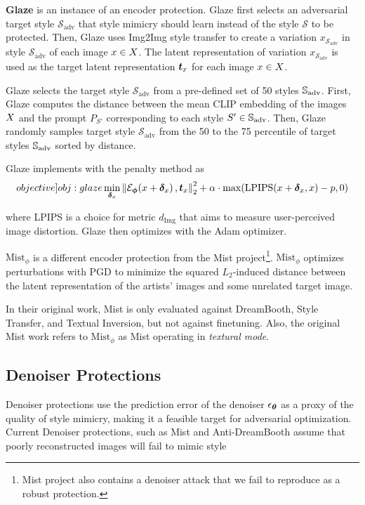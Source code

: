 \documentclass{article}
\newcommand{\style}[1]{\mathcal{#1}}
\newcommand{\advstyle}[1]{\style{#1}_{\textrm{adv}}}
\newcommand{\adv}[1]{#1_{\textrm{adv}}}
\newcommand{\enc}[0]{\mathcal{E}_{\vphi}}
\newcommand{\denoiser}[0]{\eps_{\vtheta}}
\newcommand{\mistenc}[0]{$\textrm{Mist}_{\phi}$}
\newcommand{\imgsimilarity}[0]{d_{\mathrm{Img}}}
\begin{document}
\textbf{Glaze}\label{sec:glaze} \citep{glaze} is an instance of an encoder protection. Glaze first selects an adversarial target style $\advstyle{S}$ that style mimicry should learn instead of the style $\style{S}$ to be protected. Then, Glaze uses Img2Img style transfer to create a variation $x_{\advstyle{S}}$ in style $\advstyle{S}$ of each image $x \in X$. The latent representation of variation $x_{\advstyle{S}}$ is used
as the target latent representation ${\bm{t}}_x$ for each image $x \in X$.

Glaze selects the target style $\advstyle{S}$ from a pre-defined set of 50 styles $\adv{\sS}$. First, Glaze computes the distance between the mean CLIP embedding of the images $X$ and the prompt $P_{S'}$ corresponding to each style $S' \in \adv{\sS}$. Then, Glaze randomly samples target style $\advstyle{S}$ from the 50 to the 75 percentile of target styles $\adv{\sS}$ sorted by distance. 

Glaze implements  with the penalty method \citep{penaltymethod} as
\begin{equation}
    \label[objective]{obj:glaze}
    \min_{\vdelta_x} \norm{2}{\f{\enc}{x + \vdelta_x}, \vt_x}^2 + \alpha \cdot \f{\mathrm{max}}{\f{\mathrm{LPIPS}}{x + \vdelta_x, x} - p, 0}
\end{equation}

where LPIPS \citep{LPIPS} is a choice for metric $\imgsimilarity$ that aims to measure user-perceived image distortion. Glaze then optimizes  with the Adam \citep{adam} optimizer.

\textbf{\mistenc{}}\label{sec:mistenc} \citep{mist} is a different encoder protection from the Mist project\footnote{Mist project also contains a denoiser attack that we fail to reproduce as a robust protection.}. \mistenc{} optimizes perturbations with PGD to minimize the squared $L_2$-induced distance between the latent representation of the artists' images and some unrelated target image.

In their original work, Mist is only evaluated against DreamBooth, Style Transfer, and Textual Inversion, but not against finetuning. Also, the original Mist work refers to \mistenc{} as Mist operating in \textit{textural mode}.











\subsection{Denoiser Protections}
\label{sec:denattack}
Denoiser protections use the prediction error of the denoiser $\denoiser$ as a proxy of the quality of style mimicry, making it a feasible target for adversarial optimization. Current Denoiser protections, such as Mist \citep{mist} and Anti-DreamBooth \citep{antidreambooth} assume that poorly reconstructed images will fail to mimic style
\end{document}
